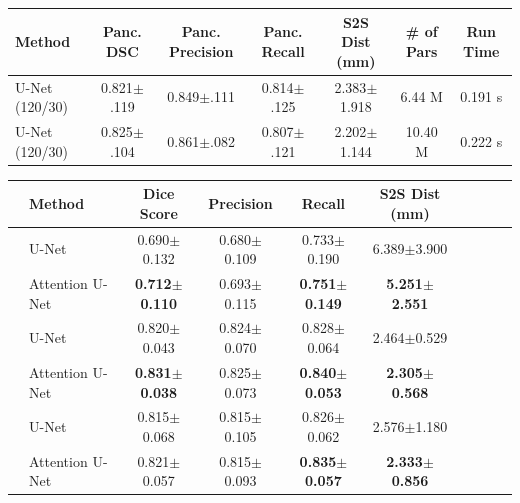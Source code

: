 \documentclass{article}
\begin{document}
\begin{table}[t]\footnotesize
	\parbox{\textwidth}{
		\centering
		\label{tab:results_attention_3}
		\vspace{1 mm}
		\begin{tabular}{@{\extracolsep{1pt}}lcccccc@{}} 
			Method  & Panc. DSC & Panc. Precision & Panc. Recall & S2S Dist (mm) &\# of Pars & Run Time   \\ \midrule
			U-Net (120/30) & 0.821$\pm$.119 & 0.849$\pm$.111 & 0.814$\pm$.125 & 2.383$\pm$1.918 & 6.44 M & 0.191 s\\
			U-Net (120/30) & 0.825$\pm$.104 & 0.861$\pm$.082 & 0.807$\pm$.121 & 2.202$\pm$1.144 & 10.40 M &  0.222 s\\
			\midrule
		\end{tabular}
		\label{tab:results_attention_4}
		\vspace{1 mm}
		\begin{tabular}{@{\extracolsep{1pt}}llcccccccc@{}} 
			& Method  & Dice Score & Precision & Recall & S2S Dist (mm)  \\ \midrule
			\parbox[t]{2mm}{}
			& U-Net \cite{ronneberger2015u} & 0.690$\pm$0.132 & 0.680$\pm$0.109 & 0.733$\pm$0.190 & 6.389$\pm$3.900\\
			& Attention U-Net & \textbf{0.712$\pm$0.110} & 0.693$\pm$0.115 & \textbf{0.751$\pm$0.149} & \textbf{5.251$\pm$2.551}\\
			\midrule
			\parbox[t]{2mm}{}
			& U-Net \cite{ronneberger2015u} & 0.820$\pm$0.043 & 0.824$\pm$0.070 & 0.828$\pm$0.064 & 2.464$\pm$0.529\\
			& Attention U-Net & \textbf{0.831$\pm$0.038} & 0.825$\pm$0.073 & \textbf{0.840$\pm$0.053} &  \textbf{2.305$\pm$0.568}\\ 
			\midrule
			\parbox[t]{2mm}{}
			& U-Net \cite{ronneberger2015u} & 0.815$\pm$0.068 & 0.815$\pm$0.105 & 0.826$\pm$0.062 & 2.576$\pm$1.180 \\
			& Attention U-Net & 0.821$\pm$0.057 & 0.815$\pm$0.093 & \textbf{0.835$\pm$0.057} & \textbf{2.333$\pm$0.856} \\
			\midrule
		\end{tabular}
	}
\end{table}
\end{document}
